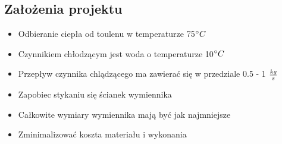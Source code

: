 \subsection{Założenia projektu}
\begin{itemize}
    \item Odbieranie ciepła od toulenu w temperaturze 75\(^\circ C\)
    \item Czynnikiem chłodzącym jest woda o temperaturze 10\(^\circ C\)
    \item Przepływ czynnika chlądzącego ma zawierać się w przedziale 0.5 - 1 \(\frac{kg}{s}\)
    \item Zapobiec stykaniu się ścianek wymiennika
    \item Całkowite wymiary wymiennika mają być jak najmniejsze
    \item Zminimalizować koszta materiału i wykonania
\end{itemize}
